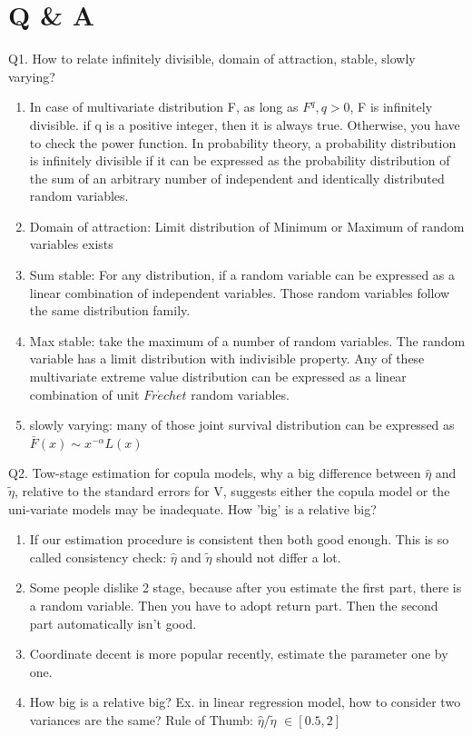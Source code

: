 \documentclass[a4paper,12pt]{texMemo}
\begin{document}
\maketitle %
\section{Q \& A}
Q1. How to relate infinitely divisible, domain of attraction, stable, slowly varying?
\begin{enumerate}
\item In case of multivariate distribution F, as long as $F^q, q>0$, F is infinitely divisible. if q is a positive integer, then it is always true. Otherwise, you have to check the power function.
In probability theory, a probability distribution is infinitely divisible if it can be expressed as the probability distribution of the sum of an arbitrary number of independent and identically distributed random variables. 
\item Domain of attraction: Limit distribution of Minimum or Maximum of random variables exists
\item Sum stable: For any distribution, if a random variable can be expressed as a linear combination of independent variables. Those random variables follow the same distribution family.
\item Max stable: take the maximum of a number of random variables. The random variable has a limit distribution with indivisible property. Any of these multivariate extreme value distribution can be expressed as a linear combination of unit $Fr\acute{e}chet$ random variables.
\item slowly varying: many of those joint survival distribution can be expressed as $\bar{F}(x) \sim x^{-\alpha} L(x)$
\end{enumerate}

Q2. Tow-stage estimation for copula models, why a big difference between $\hat{\eta}$ and $\tilde{\eta}$, relative to the standard errors for V, suggests either the copula model or the uni-variate models may be inadequate. How 'big' is a relative big?
\begin{enumerate}
\item If our estimation procedure is consistent then both good enough. This is so called consistency check: $\hat{\eta}$ and $\tilde{\eta}$ should not differ a lot.
\item Some people dislike 2 stage, because after you estimate the first part, there is a random variable. Then you have to adopt return part. Then the second part automatically isn't good.
\item Coordinate decent is more popular recently, estimate the parameter one by one. 
\item How big is a relative big? Ex. in linear regression model, how to consider two variances are the same? Rule of Thumb: $\hat{\eta}$/$\tilde{\eta}$ $\in [0.5, 2]$
\end{enumerate}
\end{document}
